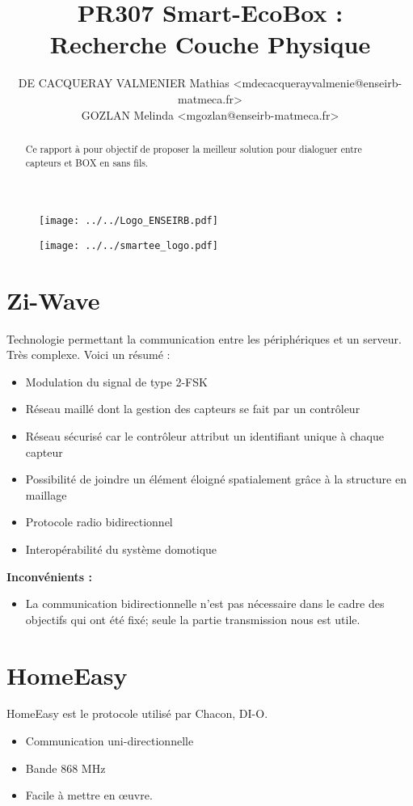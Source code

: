 \documentclass[10pt,a4paper]{article}
\title{PR307 Smart-EcoBox : \\
Recherche Couche Physique}
\author{
DE CACQUERAY VALMENIER Mathias <mdecacquerayvalmenie@enseirb-matmeca.fr> \\
GOZLAN Melinda <mgozlan@enseirb-matmeca.fr>\\}
\begin{document}
\maketitle

\begin{figure}[ht]
\begin{center}
\noindent \texttt{[image: ../../Logo\_ENSEIRB.pdf]}
\end{center}
\end{figure}
\begin{figure}[ht]
\begin{center}
\noindent \texttt{[image: ../../smartee\_logo.pdf]}
\end{center}
\end{figure}


\newpage

\tableofcontents

\newpage
\begin{abstract}
Ce rapport à pour objectif de proposer la meilleur solution pour dialoguer entre capteurs et BOX en sans fils.
\end{abstract}

\section{Zi-Wave}
Technologie permettant la communication entre les périphériques et un serveur. Très complexe. Voici un résumé :
\begin{itemize}
\item Modulation du signal de type 2-FSK
\item Réseau maillé dont la gestion des capteurs se fait par un contrôleur
\item Réseau sécurisé car le contrôleur attribut un identifiant unique à chaque capteur
\item Possibilité de joindre un élément éloigné spatialement grâce à la structure en maillage
\item Protocole radio bidirectionnel
\item Interopérabilité du système domotique
\end{itemize}
\textbf{Inconvénients :}
\begin{itemize}
\item La communication bidirectionnelle n’est pas nécessaire dans le cadre des objectifs qui ont été fixé; seule la partie transmission nous est utile. 
\end{itemize}
\section{HomeEasy}
HomeEasy est le protocole utilisé par Chacon, DI-O.
\begin{itemize}
\item Communication uni-directionnelle
\item Bande 868 MHz
\item Facile à mettre en œuvre.
\end{itemize}
\end{document}
